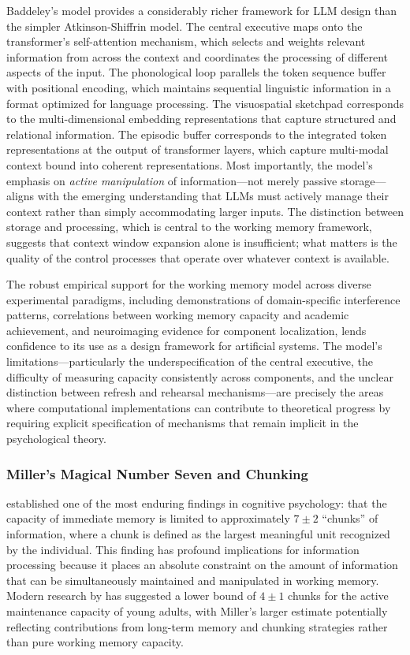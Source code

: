 \documentclass[11pt,letterpaper]{article}
\begin{document}
Baddeley's model provides a considerably richer framework for LLM design than the simpler Atkinson-Shiffrin model. The central executive maps onto the transformer's self-attention mechanism, which selects and weights relevant information from across the context and coordinates the processing of different aspects of the input. The phonological loop parallels the token sequence buffer with positional encoding, which maintains sequential linguistic information in a format optimized for language processing. The visuospatial sketchpad corresponds to the multi-dimensional embedding representations that capture structured and relational information. The episodic buffer corresponds to the integrated token representations at the output of transformer layers, which capture multi-modal context bound into coherent representations. Most importantly, the model's emphasis on \emph{active manipulation} of information---not merely passive storage---aligns with the emerging understanding that LLMs must actively manage their context rather than simply accommodating larger inputs. The distinction between storage and processing, which is central to the working memory framework, suggests that context window expansion alone is insufficient; what matters is the quality of the control processes that operate over whatever context is available.

The robust empirical support for the working memory model across diverse experimental paradigms, including demonstrations of domain-specific interference patterns, correlations between working memory capacity and academic achievement, and neuroimaging evidence for component localization, lends confidence to its use as a design framework for artificial systems. The model's limitations---particularly the underspecification of the central executive, the difficulty of measuring capacity consistently across components, and the unclear distinction between refresh and rehearsal mechanisms---are precisely the areas where computational implementations can contribute to theoretical progress by requiring explicit specification of mechanisms that remain implicit in the psychological theory.

\subsubsection{Miller's Magical Number Seven and Chunking}

\cite{miller1956magical} established one of the most enduring findings in cognitive psychology: that the capacity of immediate memory is limited to approximately $7 \pm 2$ ``chunks'' of information, where a chunk is defined as the largest meaningful unit recognized by the individual. This finding has profound implications for information processing because it places an absolute constraint on the amount of information that can be simultaneously maintained and manipulated in working memory. Modern research by \cite{cowan2001magical} has suggested a lower bound of $4 \pm 1$ chunks for the active maintenance capacity of young adults, with Miller's larger estimate potentially reflecting contributions from long-term memory and chunking strategies rather than pure working memory capacity.
\end{document}
